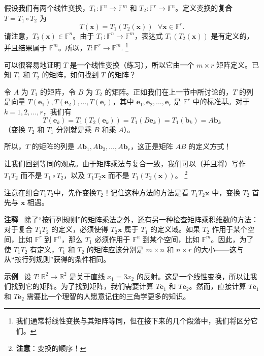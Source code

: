 假设我们有两个线性变换，$T_1: \mathbb{F}^n \to \mathbb{F}^m$ 和 $T_2: \mathbb{F}^r \to \mathbb{F}^n$。定义变换的\textbf{复合} $T = T_1 \circ T_2$ 为
$$T(\mathbf{x}) = T_1(T_2(\mathbf{x})) ~~\ \forall \mathbf{x} \in \mathbb{F}^r.$$
请注意，$T_2(\mathbf{x}) \in \mathbb{F}^n$。由于 $T_1: \mathbb{F}^n \to \mathbb{F}^m$，表达式 $T_1(T_2(\mathbf{x}))$ 是有定义的，并且结果属于 $\mathbb{F}^m$。所以，$T: \mathbb{F}^r \to \mathbb{F}^m.$
\footnote{我们通常将线性变换与其矩阵等同，但在接下来的几个段落中，我们将区分它们。}

可以很容易地证明 $T$ 是一个线性变换（练习），所以它由一个 $m \times r$ 矩阵定义。已知 $T_1$ 和 $T_2$ 的矩阵，如何找到 $T$ 的矩阵？

令 $A$ 为 $T_1$ 的矩阵，令 $B$ 为 $T_2$ 的矩阵。正如我们在上一节中所讨论的，$T$ 的列是向量 $T(\mathbf{e}_1), T(\mathbf{e}_2), \dots, T(\mathbf{e}_r)$，其中 $\mathbf{e}_1, \mathbf{e}_2, \dots, \mathbf{e}_r$ 是 $\mathbb{F}^r$ 中的标准基。对于 $k = 1, 2, \dots, r$，我们有
$$T(\mathbf{e}_k) = T_1(T_2(\mathbf{e}_k)) = T_1(B \mathbf{e}_k) = T_1(\mathbf{b}_k) = A \mathbf{b}_k$$
（变换 $T_2$ 和 $T_1$ 分别就是乘 $B$ 和乘 $A$）。

所以，$T$ 的矩阵的列是 $A \mathbf{b}_1, A \mathbf{b}_2, \dots, A \mathbf{b}_r$，这正是矩阵 $AB$ 的定义方式！

让我们回到等同的观点。由于矩阵乘法与复合一致，我们可以（并且将）写作 $T_1 T_2$ 而不是 $T_1 \circ T_2$，以及 $T_1 T_2 \mathbf{x}$ 而不是 $T_1(T_2(\mathbf{x}))$。
\footnote{\textbf{注意}：变换的顺序！ }

注意在组合$T_1 T_2$中，先作变换$T_2$！记住这种方法的方法是看 $T_1 T_2 \mathbf{x}$ 中，变换 $T_2$ 首先与 $\mathbf{x}$ 相遇。

\textbf{注释}~ 除了“按行列规则”的矩阵乘法之外，还有另一种检查矩阵乘积维数的方法：对于复合 $T_1 T_2$ 的定义，必须使得 $T_2 \mathbf{x}$ 属于 $T_1$ 的定义域。如果 $T_2$ 作用于某个空间，比如 $\mathbb{F}^r$ 到 $\mathbb{F}^n$，那么 $T_1$ 必须作用于 $\mathbb{F}^n$ 到某个空间，比如 $\mathbb{F}^m$。因此，为了使 $T_1 T_2$ 有定义，$T_1$ 和 $T_2$ 的矩阵应该分别是 $m \times n$ 和 $n \times r$ 的大小——这与从“按行列规则”获得的条件相同。

\textbf{示例}~ 设 $T: \mathbb{R}^2 \to \mathbb{R}^2$ 是关于直线 $x_1 = 3x_2$ 的反射。这是一个线性变换，所以让我们找到它的矩阵。为了找到矩阵，我们需要计算 $T \mathbf{e}_1$ 和 $T \mathbf{e}_2$。然而，直接计算 $T \mathbf{e}_1$ 和 $T \mathbf{e}_2$ 需要比一个理智的人愿意记住的三角学更多的知识。

